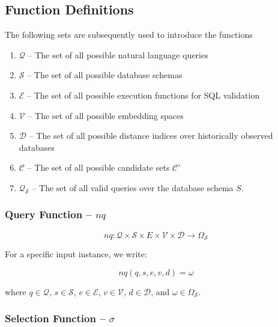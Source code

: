 \subsection{Function Definitions}\label{design:function-definitions}

The following sets are subsequently used to introduce the functions

\begin{enumerate}
    \item $\mathcal{Q}$ – The set of all possible natural language queries
    \item $\mathcal{S}$ – The set of all possible database schemas
    \item $\mathcal{E}$ – The set of all possible execution functions for SQL validation
    \item $\mathcal{V}$ – The set of all possible embedding spaces
    \item $\mathcal{D}$ – The set of all possible distance indices over historically observed databases
    \item $\mathcal{C}$ – The set of all possible candidate sets $\mathcal{C}'$
    \item $\mathcal{Q}_{\mathcal{S}}$ – The set of all valid queries over the database schema $S$.
\end{enumerate}

\subsubsection{Query Function – $nq$}

\vspace{0.5em}

$$
nq: \mathcal{Q} \times \mathcal{S} \times E \times \mathcal{V} \times \mathcal{D} \rightarrow \Omega_{\mathcal{S}}
$$

\vspace{0.5em}

For a specific input instance, we write:

$$
nq(q, s, e, v, d) = \omega
$$

\vspace{0.5em}

where $q \in \mathcal{Q}$, $s \in \mathcal{S}$, $e \in \mathcal{E}$, $v \in \mathcal{V}$, $d \in \mathcal{D}$, and $\omega \in \Omega_{\mathcal{S}}$.

\subsubsection{Selection Function – $\sigma$}\label{design:selection-function}

